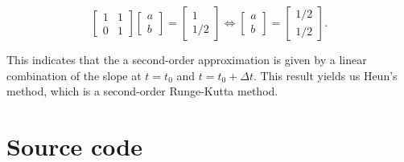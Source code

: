 \documentclass[11pt,titlepage]{report}
\begin{document}
\begin{appendices}
\begin{equation}
	\begin{bmatrix}
		1 & 1 \\
		0 & 1 
	\end{bmatrix} \begin{bmatrix}
		a \\
		b 
	\end{bmatrix} = \begin{bmatrix}
		1 \\
		1/2
	\end{bmatrix} \Leftrightarrow \begin{bmatrix}
		a \\
		b
	\end{bmatrix} = \begin{bmatrix}
		1/2 \\ 
		1/2
	\end{bmatrix}.
\end{equation}

This indicates that the a second-order approximation is given by a linear combination of the slope at $t=t_0$ and $t=t_0+\Delta t$. This result yields us Heun's method, which is a second-order Runge-Kutta method. 

\chapter{Source code}

\end{appendices}
\end{document}
